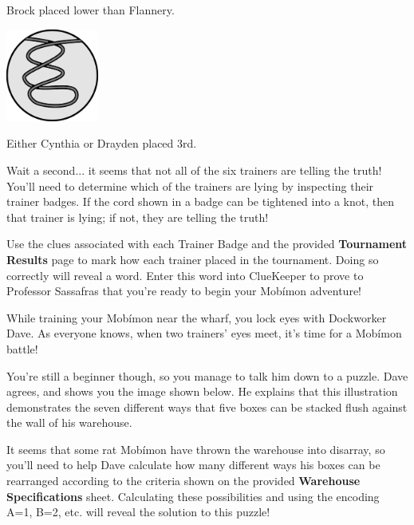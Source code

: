 \documentclass{puzzlehunt}
\begin{document}
\begin{multicols}{3}
\begin{center}
    Brock placed lower than Flannery.


    \includegraphics[width=1.2in]{assets/unknot3.pdf}

    Either Cynthia or Drayden placed 3rd.
  \end{center}
\end{multicols}

\newpage


Wait a second... it seems that not all of the six trainers are telling the truth! You'll need to determine which of the trainers are lying by inspecting their trainer badges. If the cord shown in a badge can be tightened into a knot, then that trainer is lying; if not, they are telling the truth!

Use the clues associated with each Trainer Badge and the provided \textbf{Tournament Results} 
page to mark how each trainer placed in the tournament. Doing so correctly will reveal a word. 
Enter this word into ClueKeeper to prove to Professor Sassafras that you're ready to begin your 
Mob\'imon adventure!

\vfill


While training your Mob\'imon near the wharf, you lock eyes with Dockworker Dave. As everyone knows, when two trainers' eyes meet, it's time for a Mob\'imon battle!

You're still a beginner though, so you manage to talk him down to a puzzle. Dave agrees, and shows you the image shown below. He explains that this illustration demonstrates the seven different ways that five boxes can be stacked flush against the wall of his warehouse.

It seems that some rat Mob\'imon have thrown the warehouse into disarray, so you'll need to help Dave calculate how many different ways his boxes can be rearranged according to the criteria shown on the provided 
\textbf{Warehouse Specifications} sheet. Calculating these possibilities and using the encoding A=1, B=2, etc. will reveal the solution to this puzzle!
\end{document}
